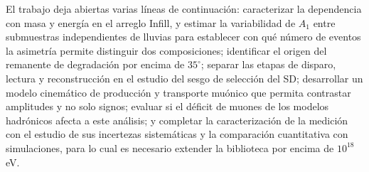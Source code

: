 El trabajo deja abiertas varias líneas de continuación: caracterizar la dependencia con masa y energía en el arreglo Infill, y estimar la variabilidad de $A_1$ entre submuestras independientes de lluvias para establecer con qué número de eventos la asimetría permite distinguir dos composiciones; identificar el origen del remanente de degradación por encima de $35^\circ$; separar las etapas de disparo, lectura y reconstrucción en el estudio del sesgo de selección del SD; desarrollar un modelo cinemático de producción y transporte muónico que permita contrastar amplitudes y no solo signos; evaluar si el déficit de muones de los modelos hadrónicos afecta a este análisis; y completar la caracterización de la medición con el estudio de sus incertezas sistemáticas y la comparación cuantitativa con simulaciones, para lo cual es necesario extender la biblioteca por encima de $10^{18}$ eV.

\newpage